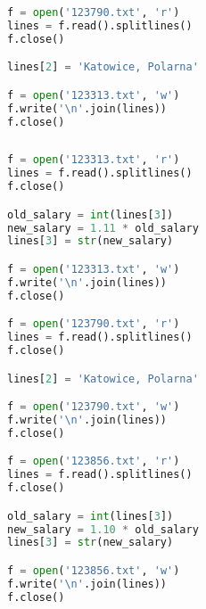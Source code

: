\documentclass[aspectratio=169]{beamer}
\begin{document}
\begin{frame}[fragile]
\begin{lstlisting}[language=python]
f = open('123790.txt', 'r')
lines = f.read().splitlines()
f.close()

lines[2] = 'Katowice, Polarna'

f = open('123313.txt', 'w')
f.write('\n'.join(lines))
f.close()
\end{lstlisting}
\end{frame}

\begin{frame}[fragile]
\begin{columns}
\begin{column}{0.5\textwidth}
\begin{lstlisting}[basicstyle=\tiny,language=python]
f = open('123313.txt', 'r')
lines = f.read().splitlines()
f.close()

old_salary = int(lines[3])
new_salary = 1.11 * old_salary
lines[3] = str(new_salary)

f = open('123313.txt', 'w')
f.write('\n'.join(lines))
f.close()

f = open('123790.txt', 'r')
lines = f.read().splitlines()
f.close()

lines[2] = 'Katowice, Polarna'

f = open('123790.txt', 'w')
f.write('\n'.join(lines))
f.close()

f = open('123856.txt', 'r')
lines = f.read().splitlines()
f.close()

old_salary = int(lines[3])
new_salary = 1.10 * old_salary
lines[3] = str(new_salary)

f = open('123856.txt', 'w')
f.write('\n'.join(lines))
f.close()
\end{lstlisting}
\end{column}
\begin{column}{0.5\textwidth}
\end{column}
\end{columns}
\end{frame}
\end{document}
